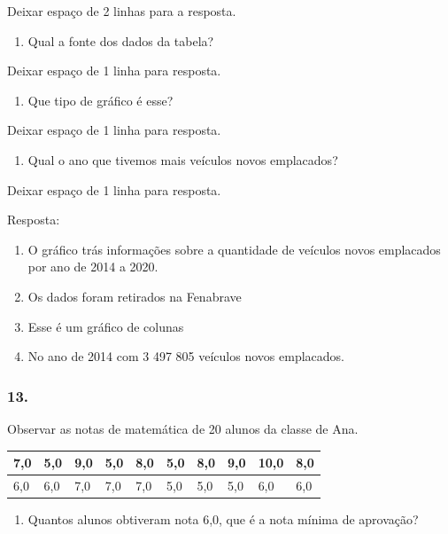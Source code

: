 Deixar espaço de 2 linhas para a resposta.

\begin{enumerate}
\def\labelenumi{\alph{enumi})}
\item
  Qual a fonte dos dados da tabela?
\end{enumerate}

Deixar espaço de 1 linha para resposta.

\begin{enumerate}
\def\labelenumi{\alph{enumi})}
\item
  Que tipo de gráfico é esse?
\end{enumerate}

Deixar espaço de 1 linha para resposta.

\begin{enumerate}
\def\labelenumi{\alph{enumi})}
\item
  Qual o ano que tivemos mais veículos novos emplacados?
\end{enumerate}

Deixar espaço de 1 linha para resposta.

Resposta:

\begin{enumerate}
\def\labelenumi{\alph{enumi})}
\item
  O gráfico trás informações sobre a quantidade de veículos novos
  emplacados por ano de 2014 a 2020.
\item
  Os dados foram retirados na Fenabrave
\item
  Esse é um gráfico de colunas
\item
  No ano de 2014 com 3 497 805 veículos novos emplacados.
\end{enumerate}

\subsubsection{13.}\label{section-119}

Observar as notas de matemática de 20 alunos da classe de Ana.

\begin{longtable}[]{@{}llllllllll@{}}
\toprule
7,0 & 5,0 & 9,0 & 5,0 & 8,0 & 5,0 & 8,0 & 9,0 & 10,0 &
8,0\tabularnewline
\midrule
\endhead
6,0 & 6,0 & 7,0 & 7,0 & 7,0 & 5,0 & 5,0 & 5,0 & 6,0 & 6,0\tabularnewline
\bottomrule
\end{longtable}

\begin{enumerate}
\def\labelenumi{\alph{enumi})}
\item
  Quantos alunos obtiveram nota 6,0, que é a nota mínima de aprovação?
\end{enumerate}

